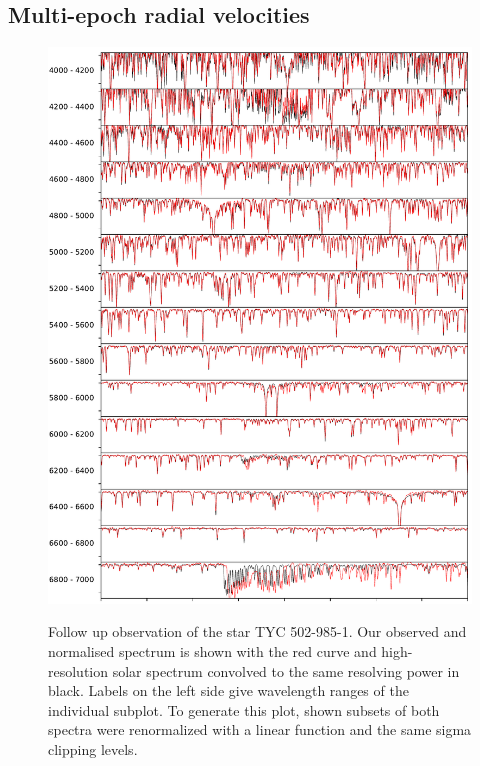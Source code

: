 \subsection{Multi-epoch radial velocities}
\label{sec:orbits_rv}

\begin{figure}
	\centering
	\includegraphics[width=\textwidth]{asiago_ref_comp.pdf}
	\label{fig:asiago_spectrum_twin}
	\caption{Follow up observation of the star TYC 502-985-1. Our observed and normalised spectrum is shown with the red curve and high-resolution solar spectrum convolved to the same resolving power in black. Labels on the left side give wavelength ranges of the individual subplot. To generate this plot, shown subsets of both spectra were renormalized with a linear function and the same sigma clipping levels.}

\end{figure}
